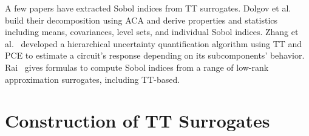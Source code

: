 \documentclass[review, twocolumn]{svjour3}          %
\newcommand{\FIXME}[1]{{\color{RED}{\textbf{FIX}: #1}}}
\begin{document}
A few papers have extracted Sobol indices from TT surrogates. Dolgov et al.~\cite{DKLM:14} build their decomposition using ACA and derive properties and statistics including means, covariances, level sets, and individual Sobol indices. Zhang et al.~\cite{ZYOKD:15} developed a hierarchical uncertainty quantification algorithm using TT and PCE to estimate a circuit's response depending on its subcomponents' behavior. Rai~\cite{Rai:14} gives formulas to compute Sobol indices from a range of low-rank approximation surrogates, including TT-based.




\section{Construction of TT Surrogates} \label{sec:tt_construction}
\end{document}
